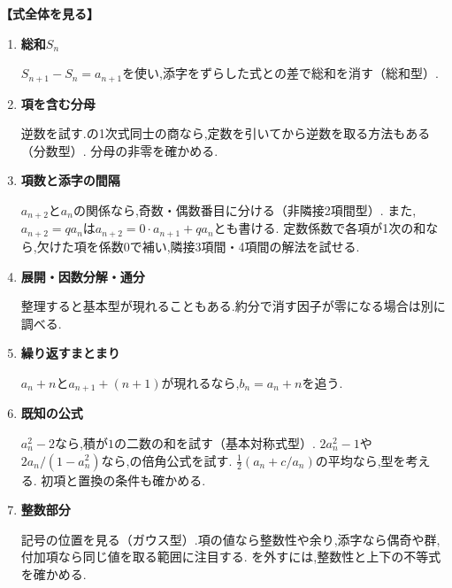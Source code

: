   \begingroup
  \medskip
  \noindent \textbf{【式全体を見る】}
  \begin{enumerate}
    \item \textbf{総和$S_n$}

      $S_{n+1}-S_n=a_{n+1}$を使い,添字をずらした式との差で総和を消す（総和型）.

    \item \textbf{項を含む分母}

      逆数を試す.の1次式同士の商なら,定数を引いてから逆数を取る方法もある（分数型）.
      分母の非零を確かめる.

    \item \textbf{項数と添字の間隔}

      $a_{n+2}$と$a_n$の関係なら,奇数・偶数番目に分ける（非隣接2項間型）.
      また,$a_{n+2}=qa_n$は$a_{n+2}=0\cdot a_{n+1}+qa_n$とも書ける.
      定数係数で各項が1次の和なら,欠けた項を係数$0$で補い,隣接3項間・4項間の解法を試せる.

    \item \textbf{展開・因数分解・通分}

      整理すると基本型が現れることもある.約分で消す因子が零になる場合は別に調べる.

    \item \textbf{繰り返すまとまり}

      $a_n+n$と$a_{n+1}+(n+1)$が現れるなら,$b_n=a_n+n$を追う.

    \item \textbf{既知の公式}

      $a_n^2-2$なら,積が$1$の二数の和を試す（基本対称式型）.
      $2a_n^2-1$や$2a_n/(1-a_n^2)$なら,の倍角公式を試す.
      $\frac12(a_n+c/a_n)$の平均なら,型を考える.
      初項と置換の条件も確かめる.


    \item \textbf{整数部分}

      記号の位置を見る（ガウス型）.項の値なら整数性や余り,添字なら偶奇や群,付加項なら同じ値を取る範囲に注目する.
      を外すには,整数性と上下の不等式を確かめる.
  \end{enumerate}

